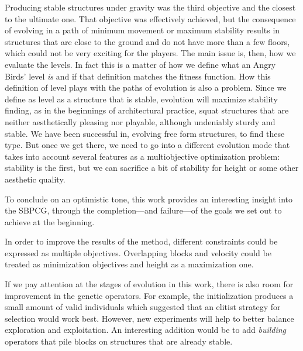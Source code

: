 \documentclass[sigconf]{acmart}
\begin{document}
Producing stable structures under gravity was the third objective and
the closest to the ultimate one. That objective was effectively
achieved, but the consequence of evolving in a path of minimum
movement or maximum stability results in structures that are close to
the ground and do not have more than a few floors, which could not be very 
exciting for the players. 
The main issue is, then, how we evaluate the levels. In fact this is 
a matter of how we define what an Angry Birds' level \textit{is} and if that 
definition matches the fitness function.
How this definition of level plays
with the paths of evolution is also a problem. Since we define as
level as a structure that is stable, evolution will maximize stability
finding, as in the beginnings of architectural practice, squat
structures that are neither aesthetically pleasing nor playable,
although undeniably sturdy and stable. We have been successful in,
evolving free form structures, to find these type. But once we get
there, we need to go into a different evolution mode that takes into
account several features as a multiobjective optimization problem:
stability is the first, but we can sacrifice a bit of stability for
height or some other aesthetic quality.


To conclude on an optimistic tone, this work provides an interesting insight 
into the SBPCG, through the completion---and failure---of the goals we
set out to achieve at the beginning.

In order to improve the results of the method, different constraints could be 
expressed as multiple objectives. Overlapping blocks and velocity could 
be treated as minimization objectives and height as a maximization one. %

If we pay attention at the stages of evolution in this work, there is also 
room for improvement in the genetic operators. For example, the initialization 
produces a small amount of valid individuals which suggested that an elitist 
strategy for selection would work best. However, new experiments will help to 
better balance exploration and exploitation. An interesting addition
would be to add {\em building} operators that pile blocks on
structures that are already stable. %
\end{document}
